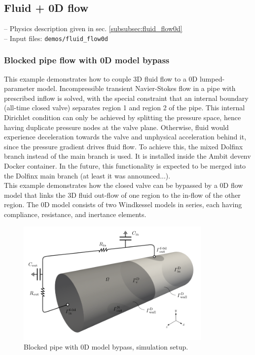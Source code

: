 \documentclass[a4paper,12pt]{report}
\begin{document}
\subsection{Fluid + 0D flow}\label{subsec:demos:fluid_flow0d}

-- Physics description given in sec. \ref{subsubsec:fluid_flow0d}\\

-- Input files: \verb"demos/fluid_flow0d"

\subsubsection*{Blocked pipe flow with 0D model bypass}

This example demonstrates how to couple 3D fluid flow to a 0D lumped-parameter model. Incompressible transient Navier-Stokes flow in a pipe with prescribed inflow is solved,
with the special constraint that an internal boundary (all-time closed valve) separates region 1 and region 2 of the pipe. This internal Dirichlet condition can only be achieved
by splitting the pressure space, hence having duplicate pressure nodes at the valve plane. Otherwise, fluid would experience deceleration towards the valve and unphysical acceleration behind it, since the pressure gradient drives fluid flow. To achieve this, the mixed Dolfinx branch instead of the main branch is used. It is installed inside the Ambit devenv Docker
container. In the future, this functionality is expected to be merged into the Dolfinx main branch (at least it was announced...).\\

This example demonstrates how the closed valve can be bypassed by a 0D flow model that links the 3D fluid out-flow of one region to the in-flow of the other region. The 0D model consists of two Windkessel models in series, each having compliance, resistance, and inertance elements.

\begin{figure}
\centering
\includegraphics[width=0.85\textwidth]{fig/pipe_0d_setup.png}
\caption{Blocked pipe with 0D model bypass, simulation setup.}
\label{fig:pipe_0d_setup}
\end{figure}
\end{document}
